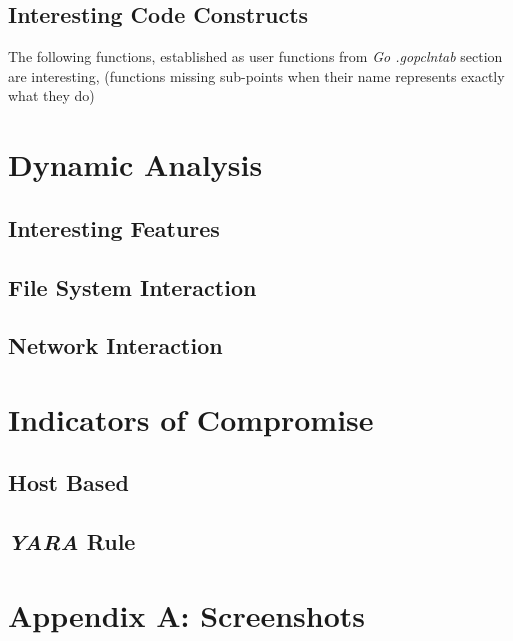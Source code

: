 \documentclass[10pt,a4paper]{article}
\begin{document}
	\subsection{Interesting Code Constructs}
	The following functions, established as user functions from \textit{Go .gopclntab} section are interesting,
	(functions missing sub-points when their name represents exactly what they do)

\newpage
\section{Dynamic Analysis}
	\subsection{Interesting Features}

	\subsection{File System Interaction}

	\subsection{Network Interaction}

\newpage

\section{Indicators of Compromise}
	\subsection{Host Based}
	\subsection{\textit{YARA} Rule}

\newpage
\section{Appendix A: Screenshots}

\newpage
\end{document}
